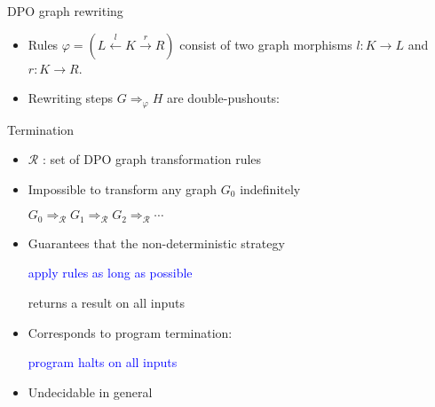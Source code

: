 \documentclass{beamer}
\begin{document}
\begin{frame}{DPO graph rewriting}
\begin{adjustwidth}{-1cm}{0cm}
\begin{itemize}
      \item Rules $\varphi = (L \overset{l}{\leftarrow} K \overset{r}{\rightarrow} R)$ consist of two graph morphisms $l: K \to L$ and $r: K \to R$.
      \item Rewriting steps $G \Rightarrow_\varphi H$ are double-pushouts:
         \begin{center}
      \end{center}
  \end{itemize} 
\end{adjustwidth}
\end{frame} 

\begin{frame}{Termination}
  \begin{itemize}
    \item $\mathcal{R}$ : set of DPO graph transformation rules
    \item Impossible to transform any graph $G_0$ indefinitely
      \begin{center}
        $G_0 \Rightarrow_\mathcal{R} G_1 \Rightarrow_\mathcal{R} G_2 \Rightarrow_\mathcal{R} \cdots$
      \end{center}
    \item Guarantees that the non-deterministic strategy
          \begin{center}
              \textcolor{blue}{apply rules as long as possible}
          \end{center}
          returns a result on all inputs
    \item Corresponds to program termination:
          \begin{center}
            \textcolor{blue}{program halts on all inputs}
          \end{center}
    \item Undecidable in general
  \end{itemize}
\end{frame}
\end{document}
